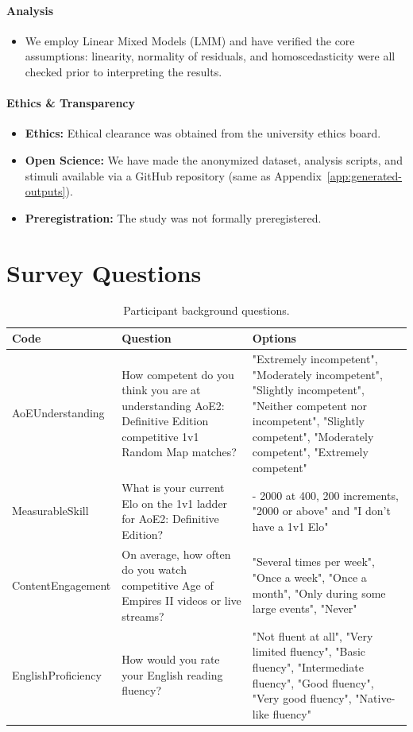 \paragraph{Analysis}
\begin{itemize}
  \item We employ Linear Mixed Models (LMM) and have verified the core assumptions: linearity, normality of residuals, and homoscedasticity were all checked prior to interpreting the results.
\end{itemize}

\paragraph{Ethics \& Transparency}
\begin{itemize}
  \item \textbf{Ethics:} Ethical clearance was obtained from the university ethics board.
  \item \textbf{Open Science:} We have made the anonymized dataset, analysis scripts, and stimuli available via a GitHub repository (same as Appendix~\ref{app:generated-outputs}).
  \item \textbf{Preregistration:} The study was not formally preregistered.
\end{itemize}

\section{Survey Questions}
\renewcommand{\arraystretch}{1.5}
\begin{table}[H]
  \centering\small\sloppy
  \begin{tabularx}{\textwidth}{>{\RaggedRight\arraybackslash}p{3.5cm} >{\RaggedRight\arraybackslash}X >{\RaggedRight\arraybackslash}X}
    \textbf{Code} & \textbf{Question} & \textbf{Options} \\
    \midrule
    AoEUnderstanding & How competent do you think you are at understanding AoE2: Definitive Edition competitive 1v1 Random Map matches? & "Extremely incompetent", "Moderately incompetent", "Slightly incompetent", "Neither competent nor incompetent", "Slightly competent", "Moderately competent", "Extremely competent" \\
    MeasurableSkill & What is your current Elo on the 1v1 ladder for AoE2: Definitive Edition? & 600 - 2000 at 400, 200 increments, "2000 or above" and "I don't have a 1v1 Elo" \\
    ContentEngagement & On average, how often do you watch competitive Age of Empires II videos or live streams? & "Several times per week", "Once a week", "Once a month", "Only during some large events", "Never" \\
    EnglishProficiency & How would you rate your English reading fluency? & "Not fluent at all", "Very limited fluency", "Basic fluency", "Intermediate fluency", "Good fluency", "Very good fluency", "Native-like fluency" \\
  \end{tabularx}
  \caption{Participant background questions.}
  \label{tab:intro-questions}
\end{table}

